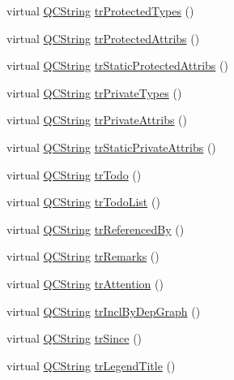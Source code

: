 \begin{DoxyCompactItemize}
\item 
virtual \hyperlink{class_q_c_string}{Q\+C\+String} \hyperlink{class_translator_arabic_a84fb6ecde68f5c0e4668382cbef72436}{tr\+Protected\+Types} ()
\item 
virtual \hyperlink{class_q_c_string}{Q\+C\+String} \hyperlink{class_translator_arabic_aef3f2d1ef85ff685b841947e080e7adc}{tr\+Protected\+Attribs} ()
\item 
virtual \hyperlink{class_q_c_string}{Q\+C\+String} \hyperlink{class_translator_arabic_a56c9c3a62aa775c4ead7bb101420fe25}{tr\+Static\+Protected\+Attribs} ()
\item 
virtual \hyperlink{class_q_c_string}{Q\+C\+String} \hyperlink{class_translator_arabic_aed28ec59bead33ee6516d40ff3c0ba8b}{tr\+Private\+Types} ()
\item 
virtual \hyperlink{class_q_c_string}{Q\+C\+String} \hyperlink{class_translator_arabic_ae21870485afd1c281aa45f23c71e6d52}{tr\+Private\+Attribs} ()
\item 
virtual \hyperlink{class_q_c_string}{Q\+C\+String} \hyperlink{class_translator_arabic_a43a962ab76b4cca3644514ba5e1560f4}{tr\+Static\+Private\+Attribs} ()
\item 
virtual \hyperlink{class_q_c_string}{Q\+C\+String} \hyperlink{class_translator_arabic_a3ee1a40eef4aab1fdff51a79cd2d8428}{tr\+Todo} ()
\item 
virtual \hyperlink{class_q_c_string}{Q\+C\+String} \hyperlink{class_translator_arabic_a0e49c3992d6c22a1fa7d9b9153c8e93e}{tr\+Todo\+List} ()
\item 
virtual \hyperlink{class_q_c_string}{Q\+C\+String} \hyperlink{class_translator_arabic_aaceef77a3ad1e454f869d45fb47fba26}{tr\+Referenced\+By} ()
\item 
virtual \hyperlink{class_q_c_string}{Q\+C\+String} \hyperlink{class_translator_arabic_acb33fc5982b95e6f6d165f29115d3455}{tr\+Remarks} ()
\item 
virtual \hyperlink{class_q_c_string}{Q\+C\+String} \hyperlink{class_translator_arabic_a8407760c524c3257aa8723ecde2893a9}{tr\+Attention} ()
\item 
virtual \hyperlink{class_q_c_string}{Q\+C\+String} \hyperlink{class_translator_arabic_a4a917e7aa6aa19176c20496e22fad2bf}{tr\+Incl\+By\+Dep\+Graph} ()
\item 
virtual \hyperlink{class_q_c_string}{Q\+C\+String} \hyperlink{class_translator_arabic_a44d001d5eda86918f053581f5c251972}{tr\+Since} ()
\item 
virtual \hyperlink{class_q_c_string}{Q\+C\+String} \hyperlink{class_translator_arabic_a4bbd8643ed28fa15c86fbc8cd38f22f5}{tr\+Legend\+Title} ()

\end{DoxyCompactItemize}
